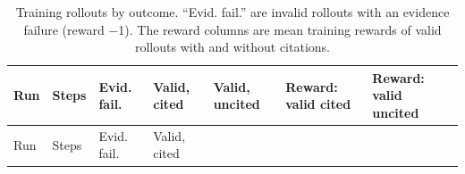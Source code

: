 \begin{longtable}[]{@{}
  >{\raggedright\arraybackslash}p{}
  >{\raggedright\arraybackslash}p{}
  >{\raggedright\arraybackslash}p{}
  >{\raggedright\arraybackslash}p{}
  >{\raggedright\arraybackslash}p{}
  >{\raggedright\arraybackslash}p{}
  >{\raggedright\arraybackslash}p{}@{}}
\caption{Training rollouts by outcome. ``Evid. fail.'' are invalid
rollouts with an evidence failure (reward −1). The reward columns are
mean training rewards of valid rollouts with and without
citations.}\label{tbl:4.4}\tabularnewline
\toprule\noalign{}
\begin{minipage}[b]{\linewidth}\raggedright
Run
\end{minipage} & \begin{minipage}[b]{\linewidth}\raggedright
Steps
\end{minipage} & \begin{minipage}[b]{\linewidth}\raggedright
Evid. fail.
\end{minipage} & \begin{minipage}[b]{\linewidth}\raggedright
Valid, cited
\end{minipage} & \begin{minipage}[b]{\linewidth}\raggedright
Valid, uncited
\end{minipage} & \begin{minipage}[b]{\linewidth}\raggedright
Reward: valid cited
\end{minipage} & \begin{minipage}[b]{\linewidth}\raggedright
Reward: valid uncited
\end{minipage} \\
\midrule\noalign{}
\endfirsthead
\toprule\noalign{}
\begin{minipage}[b]{\linewidth}\raggedright
Run
\end{minipage} & \begin{minipage}[b]{\linewidth}\raggedright
Steps
\end{minipage} & \begin{minipage}[b]{\linewidth}\raggedright
Evid. fail.
\end{minipage} & \begin{minipage}[b]{\linewidth}\raggedright
Valid, cited
\end{minipage} & \begin{minipage}[b]{\linewidth}\raggedright

\end{minipage}
\end{longtable}
